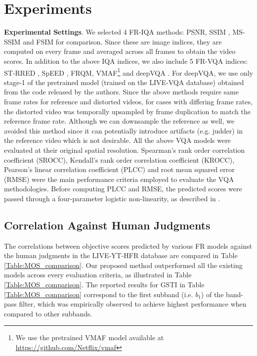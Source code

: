 \documentclass[journal]{IEEEtran}
\newcommand{\ie}{{i}.{e}.}
\newcommand{\eg}{{e}.{g}.}
\begin{document}
\section{Experiments}
\label{sec:experiments}


\textbf{Experimental Settings}.
We selected 4 FR-IQA methods: PSNR, SSIM \cite{wang2004image}, MS-SSIM \cite{wang2003multiscale} and FSIM \cite{zhang2011fsim} for comparison. Since these are image indices, they are computed on every frame and averaged across all frames to obtain the video scores. In addition to the above IQA indices, we also include 5 FR-VQA indices: ST-RRED \cite{soundararajan2012video}, SpEED \cite{bampis2017speed}, FRQM\cite{zhang2017frame}, VMAF\footnote{We use the pretrained VMAF model available at \url{https://github.com/Netflix/vmaf}} \cite{VMAF2016} and deepVQA \cite{kim2018deep}. For deepVQA, we use only stage-1 of the pretrained model (trained on the LIVE-VQA \cite{seshadrinathan2010study} database) obtained from the code released by the authors. Since the above methods require same frame rates for reference and distorted videos, for cases with differing frame rates, the distorted video was temporally upsampled by frame duplication to match the reference frame rate. Although we can downsample the reference as well, we avoided this method since it can potentially introduce artifacts (\eg{ } judder) in the reference video which is not desirable. All the above VQA models were evaluated at their original spatial resolution. Spearman's rank order correlation coefficient (SROCC), Kendall's rank order correlation coefficient (KROCC), Pearson's linear correlation coefficient (PLCC) and root mean squared error (RMSE) were the main performance criteria employed to evaluate the VQA methodologies. Before computing PLCC and RMSE, the predicted scores were passed through a four-parameter logistic non-linearity, as described in \cite{VQEG2000}.




\vspace{-7pt}
\subsection{Correlation Against Human Judgments}
The correlations between objective scores predicted by various FR models against the human judgments in the LIVE-YT-HFR database are compared in Table \ref{Table:MOS_comparison}. Our proposed method outperformed all the existing models across every evaluation criteria, as illustrated in Table \ref{Table:MOS_comparison}. The reported results for GSTI in Table \ref{Table:MOS_comparison} correspond to the first subband (\ie{ }$b_1$) of the band-pass filter, which was empirically observed to achieve highest performance when compared to other subbands. 
\end{document}
